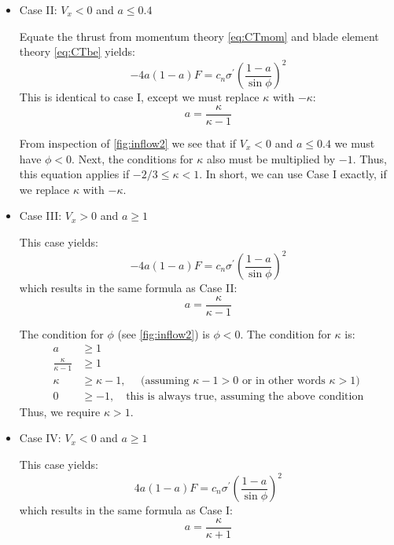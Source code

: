 \documentclass{article}
\begin{document}
\begin{itemize}
\item Case II: $V_x < 0$ and $a \le 0.4$

Equate the thrust from momentum theory \cref{eq:CTmom} and blade element theory \cref{eq:CTbe} yields:
\begin{equation}
    - 4 a (1 - a) F = c_n \sigma^\prime \left(\frac{1-a}{\sin\phi}\right)^2
\end{equation}
This is identical to case I, except we must replace $\kappa$ with $-\kappa$:
\begin{equation}
    a = \frac{\kappa}{\kappa - 1}
\end{equation}

From inspection of \cref{fig:inflow2} we see that if $V_x < 0$ and $a \le 0.4$ we must have $\phi < 0$.  Next, the conditions for $\kappa$ also must be multiplied by $-1$.  Thus, this equation applies if $-2/3 \le \kappa < 1$.  In short, we can use Case I exactly, if we replace $\kappa$ with $-\kappa$.


\item Case III: $V_x > 0$ and $a \ge 1$

This case yields:
\begin{equation}
    - 4 a (1 - a) F = c_n \sigma^\prime \left(\frac{1-a}{\sin\phi}\right)^2
\end{equation}
which results in the same formula as Case II:
\begin{equation}
    a = \frac{\kappa}{\kappa - 1}
\end{equation}

The condition for $\phi$ (see \cref{fig:inflow2}) is $\phi < 0$.  The condition for $\kappa$ is:
\begin{equation}
    \begin{aligned}
        a &\ge 1\\
        \frac{\kappa}{\kappa -1} &\ge 1\\
        \kappa &\ge \kappa -1,\quad \text{ (assuming $\kappa - 1 > 0$ or in other words $\kappa > 1$)} \\
        0 &\ge -1,\quad \text{this is always true, assuming the above condition}
    \end{aligned}
\end{equation}
Thus, we require $\kappa > 1$.

\item Case IV: $V_x < 0$ and $a \ge 1$

This case yields:
\begin{equation}
    4 a (1 - a) F = c_n \sigma^\prime \left(\frac{1-a}{\sin\phi}\right)^2
\end{equation}
which results in the same formula as Case I:
\begin{equation}
    a = \frac{\kappa}{\kappa + 1}
\end{equation}


\end{itemize}
\end{document}
